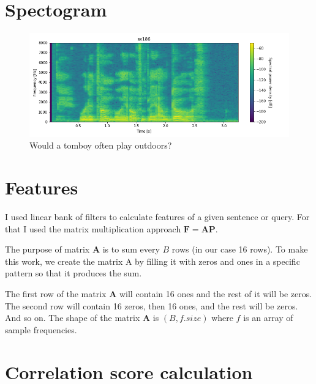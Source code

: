 \documentclass[11pt]{article}
\begin{document}
\section{Spectogram}
\begin{figure}[h]
	\includegraphics[width=\linewidth]{./sx186_spectogram.png}
	\caption{Would a tomboy often play outdoors?}
\end{figure}

\section{Features}
\par
I used linear bank of filters to calculate features of a given sentence or query. For that I used the matrix multiplication approach $\mathbf{F} = \mathbf{AP}$. 
\par
The purpose of matrix $\mathbf{A}$ is to sum every $B$ rows (in our case 16 rows). To make this work, we create the matrix A by filling it with zeros and ones in a specific pattern so that it produces the sum.
\par 
The first row of the matrix $\mathbf{A}$ will contain 16 ones and the rest of it will be zeros. The second row will contain 16 zeros, then 16 ones, and the rest will be zeros. And so on. 
The shape of the matrix $\mathbf{A}$ is $(B, f.size)$ where $f$ is an array of sample frequencies.

\section{Correlation score calculation}
\end{document}
